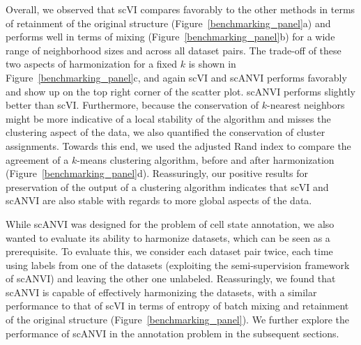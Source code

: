 Overall, we observed that scVI compares favorably to the other methods in terms of retainment of the original structure (Figure~\ref{benchmarking_panel}a) and performs well in terms of mixing (Figure~\ref{benchmarking_panel}b) for a wide range of neighborhood sizes and across all dataset pairs. The trade-off of these two aspects of harmonization for a fixed $k$ is shown in Figure~\ref{benchmarking_panel}c, and again scVI and scANVI performs favorably and show up on the top right corner of the scatter plot. scANVI performs slightly better than scVI. Furthermore, because the conservation of $k$-nearest neighbors might be more indicative of a local stability of the algorithm and misses the clustering aspect of the data, we also quantified the conservation of cluster assignments. Towards this end, we used the adjusted Rand index to compare the agreement of a $k$-means clustering algorithm, before and after harmonization (Figure~\ref{benchmarking_panel}d). Reassuringly, our positive results for preservation of the output of a clustering algorithm indicates that scVI and scANVI are also stable with regards to more global aspects of the data.

 


While scANVI was designed for the problem of cell state annotation, we also wanted to evaluate its ability to harmonize datasets, which can be seen as a prerequisite. To evaluate this, we consider each dataset pair twice, each time using labels from one of the datasets (exploiting the semi-supervision framework of scANVI) and leaving the other one unlabeled. Reassuringly, we found that scANVI is capable of effectively harmonizing the datasets, with a similar performance to that of scVI in terms of entropy of batch mixing and retainment of the original structure (Figure~\ref{benchmarking_panel}). We further explore the performance of scANVI in the annotation problem in the subsequent sections.

